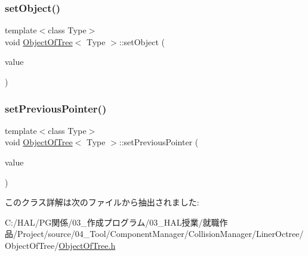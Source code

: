 \mbox{\label{class_object_of_tree_aae14cb0e8ac8b701de737c547a1d3b8c}} 
\subsubsection{\texorpdfstring{set\+Object()}{setObject()}}
{\footnotesize\ttfamily template$<$class Type$>$ \\
void \mbox{\hyperlink{class_object_of_tree}{Object\+Of\+Tree}}$<$ Type $>$\+::set\+Object (\begin{DoxyParamCaption}\item[{Type}]{value }\end{DoxyParamCaption})\hspace{0.3cm}{\ttfamily [inline]}}

\mbox{\label{class_object_of_tree_aa0ec8f6f61eb41f346796141e8ec38d5}} 
\subsubsection{\texorpdfstring{set\+Previous\+Pointer()}{setPreviousPointer()}}
{\footnotesize\ttfamily template$<$class Type$>$ \\
void \mbox{\hyperlink{class_object_of_tree}{Object\+Of\+Tree}}$<$ Type $>$\+::set\+Previous\+Pointer (\begin{DoxyParamCaption}\item[{\mbox{\hyperlink{class_object_of_tree}{Object\+Of\+Tree}}$<$ Type $>$ $\ast$}]{value }\end{DoxyParamCaption})\hspace{0.3cm}{\ttfamily [inline]}}



このクラス詳解は次のファイルから抽出されました\+:\begin{DoxyCompactItemize}
\item 
C\+:/\+H\+A\+L/\+P\+G関係/03\+\_\+作成プログラム/03\+\_\+\+H\+A\+L授業/就職作品/\+Project/source/04\+\_\+\+Tool/\+Component\+Manager/\+Collision\+Manager/\+Liner\+Octree/\+Object\+Of\+Tree/\mbox{\hyperlink{_object_of_tree_8h}{Object\+Of\+Tree.\+h}}\end{DoxyCompactItemize}

